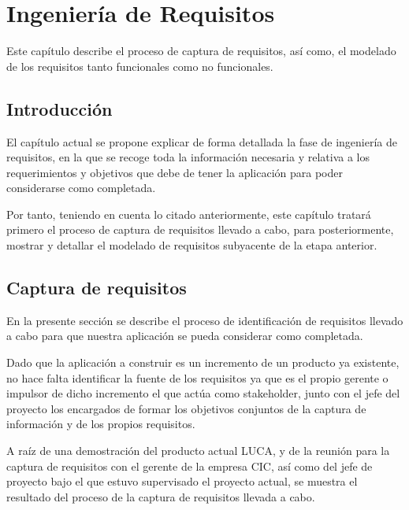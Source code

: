 \chapter{Ingeniería de Requisitos}
	
	Este capítulo describe el proceso de captura de requisitos, así como, el modelado de los requisitos tanto funcionales como no funcionales.
	
	\minitoc
	
	
	
		\section{Introducción}
		
		El capítulo actual se propone explicar de forma detallada la fase de ingeniería de requisitos, en la que se recoge toda la información necesaria y relativa a los requerimientos y objetivos que debe de tener la aplicación para poder considerarse como completada.
		
		\vspace{5mm}
		
		Por tanto, teniendo en cuenta lo citado anteriormente, este capítulo tratará primero el proceso de captura de requisitos llevado a cabo, para posteriormente, mostrar y detallar el modelado de requisitos subyacente de la etapa anterior.
		
		\section{Captura de requisitos}
		
		En la presente sección se describe el proceso de identificación de requisitos llevado a cabo para que nuestra aplicación se pueda considerar como completada. 
		
		\vspace{5mm}
		
		Dado que la aplicación a construir es un incremento de un producto ya existente, no hace falta identificar la fuente de los requisitos ya que es el propio gerente o impulsor de dicho incremento el que actúa como stakeholder, junto con el jefe del proyecto los encargados de formar los objetivos conjuntos de la captura de información y de los propios requisitos.
		
		\vspace{5mm}
		
		A raíz de una demostración del producto actual LUCA, y de la reunión para la captura de requisitos con el gerente de la empresa CIC, así como del jefe de proyecto bajo el que estuvo supervisado el proyecto actual, se muestra el resultado del proceso de la captura de requisitos llevada a cabo. 
		
